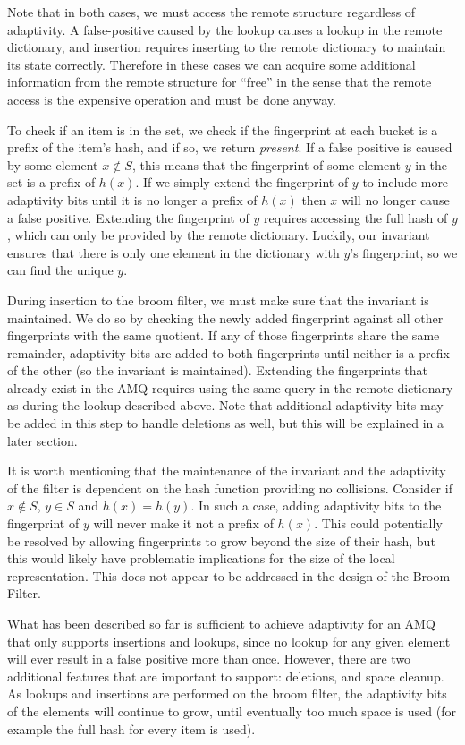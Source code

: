 \documentclass[../paper.tex]{subfiles}
\begin{document}
Note that in both cases, we must access the remote structure regardless of adaptivity. A false-positive
caused by the lookup causes a lookup in the remote dictionary, and insertion requires inserting
to the remote dictionary to maintain its state correctly. Therefore in these cases we can
acquire some additional information from the remote structure for ``free'' in the sense that
the remote access is the expensive operation and must be done anyway.

To check if an item is in the set, we check if the fingerprint at each bucket is a prefix
of the item's hash, and if so, we return \textit{present}. 
If a false positive is caused by some element $x \notin S$, this means that
the fingerprint of some element $y$ in the set is a prefix of $h(x)$. If we
simply extend the fingerprint of $y$ to include more adaptivity bits until
it is no longer a prefix of $h(x)$ then $x$ will no longer cause a false positive. Extending
the fingerprint of $y$ requires accessing the full hash of $y$, which can only be
provided by the remote dictionary. Luckily, our invariant ensures that there is
only one element in the dictionary with $y$'s fingerprint, so we can find the unique
$y$.

During insertion to the broom filter, we must make sure that the invariant is maintained.
We do so by checking the newly added fingerprint against all other fingerprints with
the same quotient. If any of those fingerprints share the same remainder, adaptivity bits are
added to both fingerprints until neither is a prefix of the other (so the invariant
is maintained). Extending the fingerprints that already exist in the AMQ requires using
the same query in the remote dictionary as during the lookup described above. Note that additional
adaptivity bits may be added in this step to handle deletions as well, but this will be
explained in a later section.

It is worth mentioning that the maintenance of the
invariant and the adaptivity of the filter is dependent on the hash
function providing no collisions.  Consider if $x \notin S$, $y \in S$ and  $h(x)
= h(y)$.  In such a case, adding adaptivity bits to the fingerprint of $y$
will never make it not a prefix of $h(x)$.  This could potentially be
resolved by allowing fingerprints to grow beyond the size of their hash,
but this would likely have problematic implications for the size of the
local representation.  This does not appear to be addressed in the design
of the Broom Filter.  

What has been described so far is sufficient to achieve adaptivity for an AMQ that
only supports insertions and lookups, since no lookup for any given element will
ever result in a false positive more than once. However, there are two additional
features that are important to support: deletions, and space cleanup. As lookups and
insertions are performed on the broom filter, the adaptivity bits of the elements will
continue to grow, until eventually too much space is used (for example the full hash
for every item is used).
     
\end{document}
